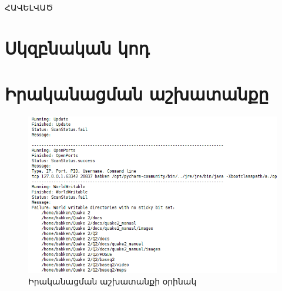 \documentclass[a4paper,12pt]{article}
\begin{document}
\begin{sloppypar}


\newpage
\vspace*{\fill}
\begingroup
\centering
\centerline{\Huge{ՀԱՎԵԼՎԱԾ}}
\endgroup
\vspace*{\fill}
\newpage


\section*{Սկզբնական կոդ}


























\end{sloppypar}


\newpage
\section*{Իրականացման աշխատանքը}


\begin{figure}[h!]
  \caption{Իրականացման աշխատանքի օրինակ}
  \centering
    \includegraphics[width=1.0\textwidth]{result.png}
\end{figure}
\end{document}
